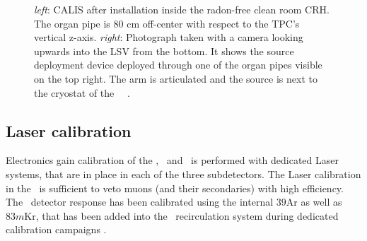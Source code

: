 \begin{figure}[htbp]
 \centering
{}
\caption{\textit{left}: CALIS after installation inside the radon-free clean room CRH. The organ pipe is 80 cm off-center with respect to the TPC's vertical z-axis. \textit{right}: Photograph taken with a camera looking upwards into the LSV from the bottom. It shows the source deployment device deployed through one of the organ pipes visible on the top right. The arm is articulated and the source is next to the cryostat of the \lar\ \tpc\ \cite{Agnes:2015qyz}.
\label{fig:CALIS_photos}}
\end{figure}

\subsection*{Laser calibration}
Electronics gain calibration of the \wcv, \lsv\ and \tpc\ is performed with dedicated Laser systems, that are in place in each of the three subdetectors. The Laser calibration in the \wcv\ is sufficient to veto muons (and their secondaries) with high efficiency. The \tpc\ detector response has been calibrated using the internal ${39}$Ar as well as $83m$Kr, that has been added into the \lar\ recirculation system during dedicated calibration campaigns \cite{Agnes:2015gu}.







